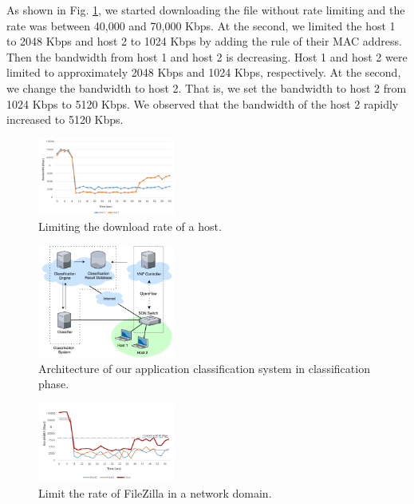 \documentclass[conference]{IEEEtran}
\begin{document}
As shown in Fig. \ref{fig:qos_limit_host}, we started downloading the file without rate limiting and the rate was between 40,000 and 70,000 Kbps.
At the  second, we limited the host 1 to 2048 Kbps and host 2 to 1024 Kbps by adding the rule of their MAC address.
Then the bandwidth from host 1 and host 2 is decreasing. Host 1 and host 2 were limited to approximately 2048 Kbps and 1024 Kbps, respectively.
At the  second, we change the bandwidth to host 2. That is, we set the bandwidth to host 2 from 1024 Kbps to 5120 Kbps.
We observed that the bandwidth of the host 2 rapidly increased to 5120 Kbps.

\begin{figure}[!t]
\centering
\includegraphics[width=0.4\textwidth]{./figures/qos_limit_host}
\caption{Limiting the download rate of a host.}
\label{fig:qos_limit_host}
\end{figure}

\begin{figure}[!t]
\centering
\includegraphics[width=0.4\textwidth]{./figures/classification_classifying}
\caption{Architecture of our application classification system in classification phase.}
\label{fig:class_classifying}
\end{figure}

\begin{figure}[!t]
\centering
\includegraphics[width=0.4\textwidth]{./figures/mft_qos_rate_domain_app}
\caption{Limit the rate of FileZilla in a network domain.}
\label{fig:mft_qos_rate_domain_app}
\end{figure}
\end{document}
